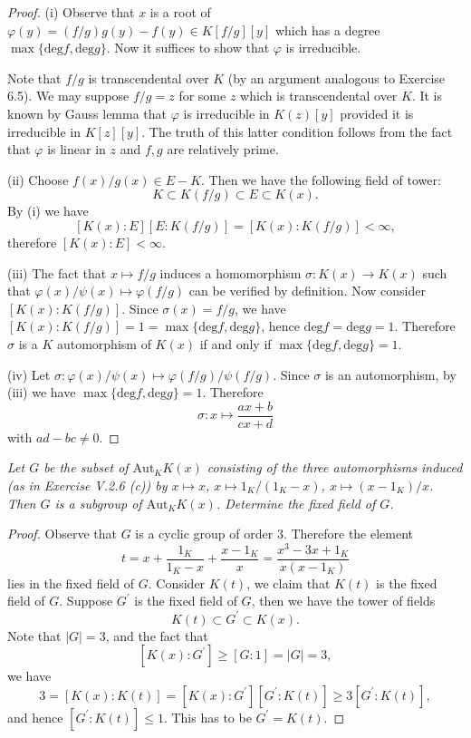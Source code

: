 \begin{proof}
(i) Observe that $x$ is a root of $\varphi(y)=(f/g)g(y)-f(y)\in K[f/g][y]$ which has a degree $\max\{\mathrm{deg}f,\mathrm{deg}g\}$. Now it suffices to show that $\varphi$ is irreducible.\par
Note that $f/g$ is transcendental over $K$ (by an argument analogous to Exercise 6.5). We may suppose $f/g=z$ for some $z$ which is transcendental over $K$. It is known by Gauss lemma that $\varphi$ is irreducible in $K(z)[y]$ provided it is irreducible in $K[z][y]$. The truth of this latter condition follows from the fact that $\varphi$ is linear in $z$ and $f,g$ are relatively prime.\par
(ii) Choose $f(x)/g(x)\in E-K$. Then we have the following field of tower: 
$$
K\subset K\left( f/g \right) \subset E\subset K\left( x \right) .
$$
By (i) we have 
$$
\left[ K\left( x \right) :E \right] \left[ E:K\left( f/g \right) \right] =\left[ K\left( x \right) :K\left( f/g \right) \right] <\infty ,
$$
therefore $[K(x):E]<\infty$.\par
(iii) The fact that $x\mapsto f/g$ induces a homomorphism $\sigma:K(x)\to K(x)$ such that $\varphi(x)/\psi(x)\mapsto\varphi(f/g)$ can be verified by definition. Now consider $[K(x):K(f/g)]$. Since $\sigma(x)=f/g$, we have $[K(x):K(f/g)]=1=\max\{\mathrm{deg}f,\mathrm{deg}g\}$, hence $\mathrm{deg}f=\mathrm{deg}g=1$. Therefore $\sigma$ is a $K$ automorphism of $K(x)$ if and only if $\max\{\mathrm{deg}f,\mathrm{deg}g\}=1$.\par
(iv) Let $\sigma:\varphi(x)/\psi(x)\mapsto\varphi(f/g)/\psi(f/g)$. Since $\sigma$ is an automorphism, by (iii) we have $\max\{\mathrm{deg}f,\mathrm{deg}g\}=1$. Therefore $$\sigma:x\mapsto\frac{ax+b}{cx+d}$$
with $ad-bc\ne 0$.
\end{proof}
\begin{problem}\em
Let $G$ be the subset of $\mathrm{Aut}_K K(x)$ consisting of the three automorphisms induced (as in Exercise {V.2.6} (c)) by $x\mapsto x$, $x\mapsto 1_K/(1_K-x)$, $x\mapsto (x-1_K)/x$. Then $G$ is a subgroup of $\mathrm{Aut}_K K(x)$. Determine the fixed field of $G$.
\end{problem}
\begin{proof}
Observe that $G$ is a cyclic group of order $3$. Therefore the element 
$$
t=x+\frac{1_K}{1_K-x}+\frac{x-1_K}{x}=\frac{x^3-3x+1_K}{x\left( x-1_K \right)}
$$
lies in the fixed field of $G$. Consider $K(t)$, we claim that $K(t)$ is the fixed field of $G$. Suppose $G^\prime$ is the fixed field of $G$, then we have the tower of fields 
$$K(t)\subset G^\prime\subset K(x).$$
Note that $|G|=3$, and the fact that 
$$
\left[ K\left( x \right) :G^{\prime} \right] \ge \left[ G:1 \right] =\left| G \right|=3,
$$
we have 
$$
3=\left[ K\left( x \right) :K\left( t \right) \right] =\left[ K\left( x \right) :G^{\prime} \right] \left[ G^{\prime}:K\left( t \right) \right] \ge 3\left[ G^{\prime}:K\left( t \right) \right] ,
$$
and hence $[G^\prime:K(t)]\le 1$. This has to be $G^\prime=K(t)$.
\end{proof}
